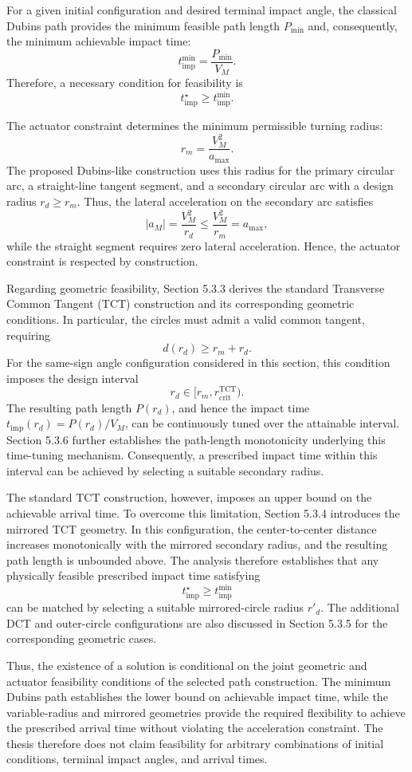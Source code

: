 \documentclass[11pt,a4paper]{article}
\begin{document}
For a given initial configuration and desired terminal impact angle, the classical Dubins path provides the minimum feasible path length $P_{\min}$ and, consequently, the minimum achievable impact time:
\[
t_{\mathrm{imp}}^{\min}=\frac{P_{\min}}{V_M}.
\]
Therefore, a necessary condition for feasibility is
\[
t^\star_{\mathrm{imp}}\geq t_{\mathrm{imp}}^{\min}.
\]

The actuator constraint determines the minimum permissible turning radius:
\[
r_m=\frac{V_M^2}{a_{\max}}.
\]
The proposed Dubins-like construction uses this radius for the primary circular arc, a straight-line tangent segment, and a secondary circular arc with a design radius $r_d\geq r_m$. Thus, the lateral acceleration on the secondary arc satisfies
\[
|a_M|=\frac{V_M^2}{r_d}
\leq \frac{V_M^2}{r_m}=a_{\max},
\]
while the straight segment requires zero lateral acceleration. Hence, the actuator constraint is respected by construction.

Regarding geometric feasibility, Section 5.3.3 derives the standard Transverse Common Tangent (TCT) construction and its corresponding geometric conditions. In particular, the circles must admit a valid common tangent, requiring
\[
d(r_d)\geq r_m+r_d.
\]
For the same-sign angle configuration considered in this section, this condition imposes the design interval
\[
r_d\in[r_m,r_{\mathrm{crit}}^{\mathrm{TCT}}).
\]
The resulting path length $P(r_d)$, and hence the impact time $t_{\mathrm{imp}}(r_d)=P(r_d)/V_M$, can be continuously tuned over the attainable interval. Section 5.3.6 further establishes the path-length monotonicity underlying this time-tuning mechanism. Consequently, a prescribed impact time within this interval can be achieved by selecting a suitable secondary radius.

The standard TCT construction, however, imposes an upper bound on the achievable arrival time. To overcome this limitation, Section 5.3.4 introduces the mirrored TCT geometry. In this configuration, the center-to-center distance increases monotonically with the mirrored secondary radius, and the resulting path length is unbounded above. The analysis therefore establishes that any physically feasible prescribed impact time satisfying
\[
t^\star_{\mathrm{imp}}\geq t_{\mathrm{imp}}^{\min}
\]
can be matched by selecting a suitable mirrored-circle radius $r'_d$. The additional DCT and outer-circle configurations are also discussed in Section 5.3.5 for the corresponding geometric cases.

Thus, the existence of a solution is conditional on the joint geometric and actuator feasibility conditions of the selected path construction. The minimum Dubins path establishes the lower bound on achievable impact time, while the variable-radius and mirrored geometries provide the required flexibility to achieve the prescribed arrival time without violating the acceleration constraint. The thesis therefore does not claim feasibility for arbitrary combinations of initial conditions, terminal impact angles, and arrival times.
\end{document}
